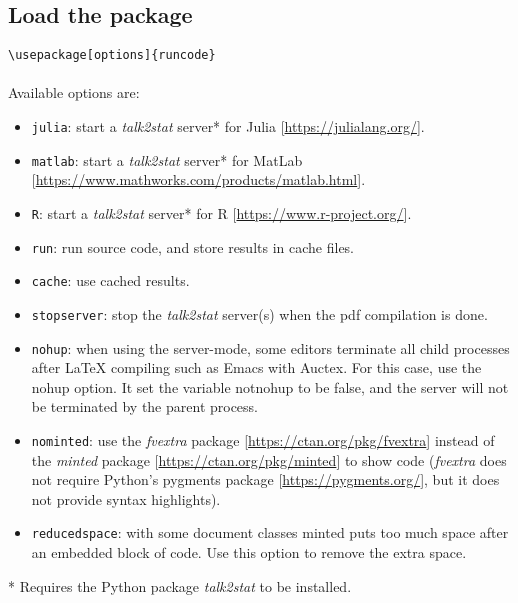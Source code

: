 \documentclass{ltxdoc}
\begin{document}
\subsection{Load the package}
\verb|\usepackage[options]{runcode}|\\
\\
Available options are: 
\begin{itemize}
\item  \texttt{julia}: start a \textit{talk2stat} server* for Julia [\url{https://julialang.org/}].
\item  \texttt{matlab}: start a \textit{talk2stat} server* for MatLab [\url{https://www.mathworks.com/products/matlab.html}].
\item  \texttt{R}: start a \textit{talk2stat} server* for R [\url{https://www.r-project.org/}].
\item  \texttt{run}: run source code, and store results in cache files.
\item  \texttt{cache}: use cached results.
\item  \texttt{stopserver}: stop the \textit{talk2stat} server(s) when the pdf compilation is done.
\item  \texttt{nohup}:  when using the server-mode, some editors terminate all child processes after LaTeX compiling such as Emacs with Auctex. For this case, use the nohup option. It set the variable notnohup to be false, and the server will not be terminated by the parent process.
\item  \texttt{nominted}: use the \textit{fvextra} package [\url{https://ctan.org/pkg/fvextra}] instead of the \textit{minted}  package [\url{https://ctan.org/pkg/minted}] to show code (\textit{fvextra} does not require Python's pygments package [\url{https://pygments.org/}], but it does not provide syntax highlights).
\item \texttt{reducedspace}: with some document classes minted puts too much space after an embedded block of code. Use this option to remove the extra space. 
\end{itemize}
* Requires the Python package \textit{talk2stat} to be installed.
\end{document}
